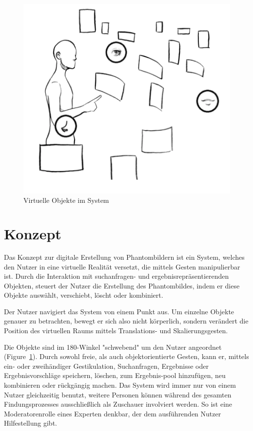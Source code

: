 \documentclass{sigchi-ext}
\begin{document}
\begin{figure}
  \centering
  \includegraphics[width=1\marginparwidth]{figures/system_overview}
  \caption{Virtuelle Objekte im System}
  \label{fig:systemoverview}
\end{figure}

\section{Konzept}

Das Konzept zur digitale Erstellung von Phantombildern ist ein System, welches den Nutzer in eine virtuelle Realität versetzt, die mittels Gesten manipulierbar ist. Durch die Interaktion mit suchanfragen- und ergebnisrepräsentierenden Objekten, steuert der Nutzer die Erstellung des Phantombildes, indem er diese Objekte auswählt, verschiebt, löscht oder kombiniert. 

Der Nutzer navigiert das System von einem Punkt aus. Um einzelne Objekte genauer zu betrachten, bewegt er sich also nicht körperlich, sondern verändert die Position des virtuellen Raums mittels Translations- und Skalierungsgesten.

Die Objekte sind im 180-Winkel "schwebend" um den Nutzer angeordnet (Figure~\ref{fig:systemoverview}). Durch sowohl freie, als auch objektorientierte Gesten, kann er, mittels ein- oder zweihändiger Gestikulation, Suchanfragen, Ergebnisse oder Ergebnisvorschläge speichern, löschen, zum Ergebnis-pool hinzufügen, neu kombinieren oder rückgängig machen.
Das System wird immer nur von einem Nutzer gleichzeitig benutzt,
weitere Personen können während des gesamten Findungsprozesses
ausschließlich als Zuschauer involviert werden. So ist eine
Moderatorenrolle eines Experten denkbar, der dem ausführenden Nutzer Hilfestellung gibt.
\end{document}
